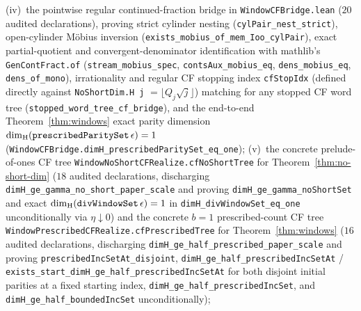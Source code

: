 \begin{remark}
(iv)~the pointwise regular continued-fraction bridge in \texttt{WindowCFBridge.lean} ($20$ audited declarations), proving strict cylinder nesting (\texttt{cylPair\_\allowbreak nest\_\allowbreak strict}), open-cylinder M\"obius inversion (\texttt{exists\_\allowbreak mobius\_\allowbreak of\_\allowbreak mem\_\allowbreak Ioo\_\allowbreak cylPair}), exact partial-quotient and convergent-denominator identification with mathlib's \texttt{GenContFract.of} (\texttt{stream\_\allowbreak mobius\_\allowbreak spec}, \texttt{contsAux\_\allowbreak mobius\_\allowbreak eq}, \texttt{dens\_\allowbreak mobius\_\allowbreak eq}, \texttt{dens\_\allowbreak of\_\allowbreak mono}), irrationality and regular CF stopping index \texttt{cfStopIdx} (defined directly against \texttt{NoShortDim.H j} $=\lfloor Q_j\sqrt{j}\rfloor$) matching for any stopped CF word tree (\texttt{stopped\_\allowbreak word\_\allowbreak tree\_\allowbreak cf\_\allowbreak bridge}), and the end-to-end Theorem~\ref{thm:windows} exact parity dimension $\dim_{\mathrm{H}}(\texttt{prescribedParitySet}\,\epsilon)=1$ (\texttt{WindowCFBridge.\allowbreak dimH\_\allowbreak prescribedParitySet\_\allowbreak eq\_\allowbreak one});
(v)~the concrete prelude-of-ones CF tree \texttt{WindowNoShortCFRealize.\allowbreak cfNoShortTree} for Theorem~\ref{thm:no-short-dim} ($18$ audited declarations, discharging \texttt{dimH\_\allowbreak ge\_\allowbreak gamma\_\allowbreak no\_\allowbreak short\_\allowbreak paper\_\allowbreak scale} and proving \texttt{dimH\_\allowbreak ge\_\allowbreak gamma\_\allowbreak noShortSet} and exact $\dim_{\mathrm{H}}(\texttt{divWindowSet}\,\epsilon)=1$ in \texttt{dimH\_\allowbreak divWindowSet\_\allowbreak eq\_\allowbreak one} unconditionally via $\eta\downarrow0$) and the concrete $b=1$ prescribed-count CF tree \texttt{WindowPrescribedCFRealize.\allowbreak cfPrescribedTree} for Theorem~\ref{thm:windows} ($16$ audited declarations, discharging \texttt{dimH\_\allowbreak ge\_\allowbreak half\_\allowbreak prescribed\_\allowbreak paper\_\allowbreak scale} and proving \texttt{prescribedIncSetAt\_\allowbreak disjoint}, \texttt{dimH\_\allowbreak ge\_\allowbreak half\_\allowbreak prescribedIncSetAt} / \texttt{exists\_\allowbreak start\_\allowbreak dimH\_\allowbreak ge\_\allowbreak half\_\allowbreak prescribedIncSetAt} for both disjoint initial parities at a fixed starting index, \texttt{dimH\_\allowbreak ge\_\allowbreak half\_\allowbreak prescribedIncSet}, and \texttt{dimH\_\allowbreak ge\_\allowbreak half\_\allowbreak boundedIncSet} unconditionally);

\end{remark}
